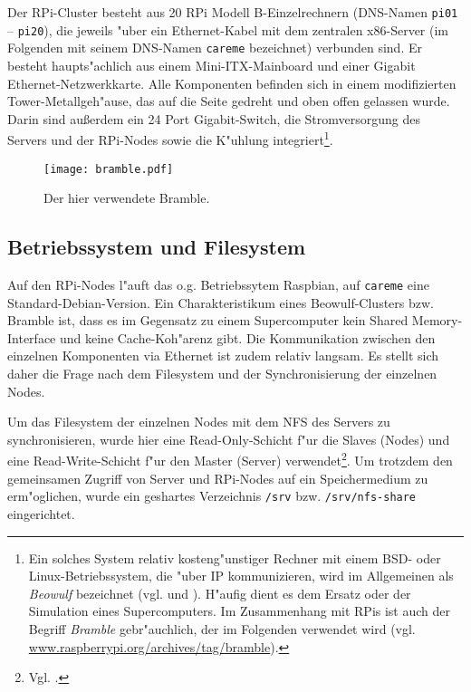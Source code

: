 Der RPi-Cluster besteht aus 20 RPi Modell B-Einzelrechnern (DNS-Namen \texttt{pi01} -- \texttt{pi20}), die jeweils "uber ein Ethernet-Kabel mit dem zentralen x86-Server (im Folgenden mit seinem DNS-Namen \texttt{careme} bezeichnet) verbunden sind. Er besteht haupts"achlich aus einem Mini-ITX-Mainboard und einer Gigabit Ethernet-Netzwerkkarte. Alle Komponenten befinden sich in einem modifizierten Tower-Metallgeh"ause, das auf die Seite gedreht und oben offen gelassen wurde. Darin sind au\ss erdem ein 24 Port Gigabit-Switch, die Stromversorgung des Servers und der RPi-Nodes sowie die K"uhlung integriert\footnote{Ein solches System relativ kosteng"unstiger Rechner mit einem BSD- oder Linux-Betriebssystem, die "uber IP kommunizieren, wird im Allgemeinen als \textit{Beowulf} bezeichnet (vgl. \cite{kie01} und \cite{kli13}). H"aufig dient es dem Ersatz oder der Simulation eines Supercomputers. Im Zusammenhang mit RPis ist auch der Begriff \textit{Bramble} gebr"auchlich, der im Folgenden verwendet wird (vgl. \url{www.raspberrypi.org/archives/tag/bramble}).}. 
\begin{figure}[htb]
	\centering
	\texttt{[image: bramble.pdf]}\\ 
	\caption{Der hier verwendete Bramble.}\label{fig:Bramble}
\end{figure}
\newpage
\subsection{Betriebssystem und Filesystem}\label{Bramble-Architektur} 

Auf den RPi-Nodes l"auft das o.g. Betriebssytem Raspbian, auf \texttt{careme} eine Standard-Debian-Version. Ein Charakteristikum eines Beowulf-Clusters bzw. Bramble ist, dass es im Gegensatz zu einem Supercomputer kein Shared Memory-Interface und keine Cache-Koh"arenz gibt. Die Kommunikation zwischen den einzelnen Komponenten via Ethernet ist zudem relativ langsam. Es stellt sich daher die Frage nach dem Filesystem und der Synchronisierung der einzelnen Nodes. 

Um das Filesystem der einzelnen Nodes mit dem NFS des Servers zu synchronisieren, wurde hier eine Read-Only-Schicht f"ur die Slaves (Nodes) und eine Read-Write-Schicht f"ur den Master (Server) verwendet\footnote{Vgl. \cite{kli13}.}. Um trotzdem den gemeinsamen Zugriff von Server und RPi-Nodes auf ein Speichermedium zu erm"oglichen, wurde ein geshartes Verzeichnis \texttt{/srv} bzw. \texttt{/srv/nfs-share} eingerichtet. 

